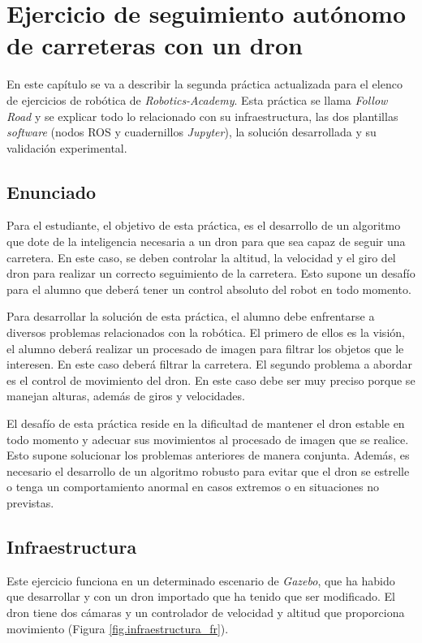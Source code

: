 \chapter{Ejercicio de seguimiento autónomo de carreteras con un  dron}\label{cap.followroad}
En este capítulo se va a describir la segunda práctica actualizada para el elenco de ejercicios de robótica de \textit{Robotics-Academy}. Esta práctica se llama \textit{Follow Road} y se explicar todo lo relacionado con su infraestructura, las dos plantillas \textit{software} (nodos ROS y cuadernillos \textit{Jupyter}), la solución desarrollada y su validación experimental.

\section{Enunciado}\label{sec.enunciado}
Para el estudiante, el objetivo de esta práctica, es el desarrollo de un algoritmo que dote de la inteligencia necesaria a un dron para que sea capaz de seguir una carretera. En este caso, se deben controlar la altitud, la velocidad y el giro del dron para realizar un correcto seguimiento de la carretera. Esto supone un desafío para el alumno que deberá tener un control absoluto del robot en todo momento.

Para desarrollar la solución de esta práctica, el alumno debe enfrentarse a diversos problemas relacionados con la robótica. El primero de ellos es la visión, el alumno deberá realizar un procesado de imagen para filtrar los objetos que le interesen. En este caso deberá filtrar la carretera. El segundo problema a abordar es el control de movimiento del dron. En este caso debe ser muy preciso porque se manejan alturas, además de giros y velocidades.

El desafío de esta práctica reside en la dificultad de mantener el dron estable en todo momento y adecuar sus movimientos al procesado de imagen que se realice. Esto supone solucionar los problemas anteriores de manera conjunta. Además, es necesario el desarrollo de un algoritmo robusto para evitar que el dron se estrelle o tenga un comportamiento anormal en casos extremos o en situaciones no previstas.

\section{Infraestructura}
Este ejercicio funciona en un determinado escenario de \textit{Gazebo}, que ha habido que desarrollar y con un dron importado que ha tenido que ser modificado. El dron tiene dos cámaras y un controlador de velocidad y altitud que proporciona movimiento (Figura \ref{fig.infraestructura_fr}).

